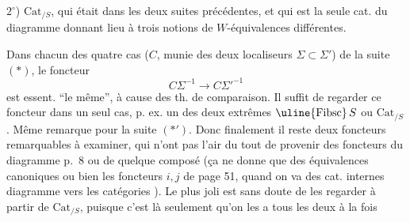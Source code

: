 $2^\circ$) $\mathrm{Cat}_{/S}$, qui était  dans les deux suites précédentes, et qui est la seule cat. du diagramme donnant lieu à trois notions de $W$-équivalences différentes.

Dans chacun des quatre cas  ($C$, munie des deux localiseurs $\Sigma\subset\Sigma'$) de la suite $(*)$,   le foncteur
\[
 C\Sigma^{-1}\longrightarrow C\Sigma'^{-1}
\]
est essent. ``le même'', à cause des th. de comparaison. Il suffit de regarder ce foncteur dans un seul cas, p. ex. un des deux extrêmes $\text{\uline{Fibsc}}\,S$ ou $\mathrm{Cat}_{/S}$. Même remarque pour la suite $(*')$. Donc finalement il reste deux foncteurs remarquables
à examiner, qui n'ont pas l'air du tout de provenir des foncteurs du diagramme p.~8 ou de quelque composé (ça ne donne que des équivalences canoniques ou bien les foncteurs $i,j$ de page 51\unsure{)|,}, quand on va des cat. internes  diagramme vers les catégories ). Le plus joli est sans doute de les regarder à partir de $\mathrm{Cat}_{/S}$, puisque c'est là seulement qu'on les a tous les deux à la fois

